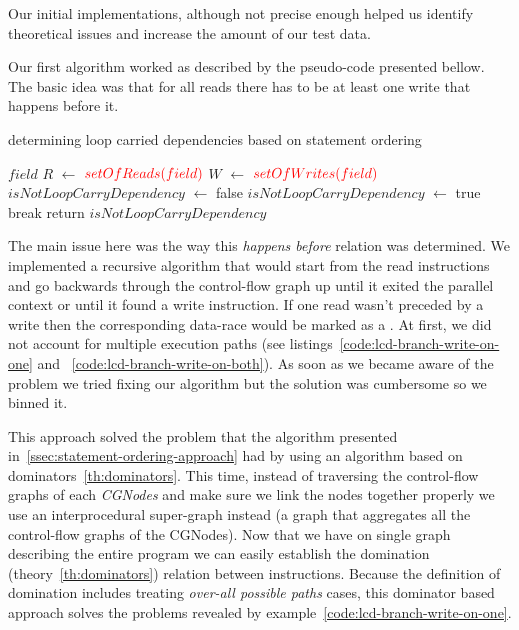 Our initial implementations, although not precise enough helped us identify
theoretical issues and increase the amount of our test data.

Our first algorithm worked as described by the pseudo-code presented bellow. The
basic idea was that for all reads there has to be at least one write that
happens before it.

\begin{algorithm}[h]
\caption{determining loop carried dependencies based on statement ordering}
\begin{algorithmic}[1]
	\State $field$
	\State $R$ $\leftarrow$ ${\color{red} setOfReads(field)}$
	\State $W$ $\leftarrow$ ${\color{red} setOfWrites(field)}$
		\State $isNotLoopCarryDependency$ $\leftarrow$ false
				\State $isNotLoopCarryDependency$ $\leftarrow$ true
				\State break
			\EndIf
		\EndFor
	\State return $isNotLoopCarryDependency$
	\EndFor
\end{algorithmic}
\label{alg:LCD}
\end{algorithm}

The main issue here was the way this \emph{happens before} relation was
determined. We implemented a recursive algorithm that would start from the read
instructions and go backwards through the control-flow graph up until it exited
the parallel context or until it found a write instruction. If one read wasn't
preceded by a write then the corresponding data-race would be marked as a \lcd.
At first, we did not account for multiple execution paths (see
listings~\ref{code:lcd-branch-write-on-one} and
~\ref{code:lcd-branch-write-on-both}). As soon as we became aware of the problem
we tried fixing our algorithm but the solution was cumbersome so we binned it.

This approach solved the problem that the algorithm presented
in~\ref{ssec:statement-ordering-approach} had by using an algorithm based on
dominators~\ref{th:dominators}. This time, instead of traversing the
control-flow graphs of each \emph{CGNodes} and make sure we link the nodes
together properly we use an interprocedural super-graph instead (a graph that
aggregates all the control-flow graphs of the CGNodes). Now that we have on
single graph describing the entire program we can easily establish the
domination (theory~\ref{th:dominators}) relation between instructions. Because
the definition of domination includes treating \emph{over-all possible paths}
cases, this dominator based approach solves the problems revealed by
example~\ref{code:lcd-branch-write-on-one}.

